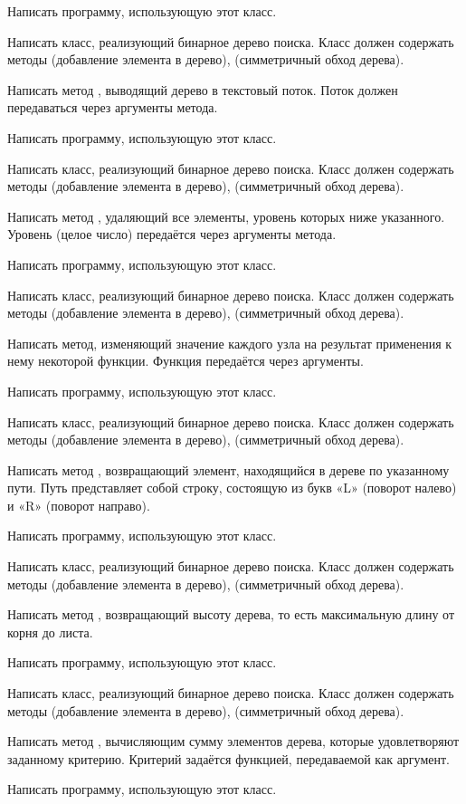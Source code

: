 Написать программу, использующую этот класс.

\task Написать класс, реализующий бинарное дерево поиска. Класс должен
содержать методы  (добавление элемента в дерево),
 (симметричный обход дерева).

Написать метод , выводящий дерево в текстовый поток. Поток
должен передаваться через аргументы метода.

Написать программу, использующую этот класс.

\task Написать класс, реализующий бинарное дерево поиска. Класс должен
содержать методы  (добавление элемента в дерево),
 (симметричный обход дерева).

Написать метод , удаляющий все элементы, уровень которых
ниже указанного. Уровень (целое число) передаётся через аргументы
метода.

Написать программу, использующую этот класс.

\task Написать класс, реализующий бинарное дерево поиска. Класс должен
содержать методы  (добавление элемента в дерево),
 (симметричный обход дерева).

Написать метод, изменяющий значение каждого узла на результат
применения к нему некоторой функции. Функция передаётся через
аргументы.

Написать программу, использующую этот класс.

\task Написать класс, реализующий бинарное дерево поиска. Класс должен
содержать методы  (добавление элемента в дерево),
 (симметричный обход дерева).

Написать метод , возвращающий элемент, находящийся в
дереве по указанному пути. Путь представляет собой
строку, состоящую из букв «L» (поворот налево) и «R» (поворот
направо).

Написать программу, использующую этот класс.

\task Написать класс, реализующий бинарное дерево поиска. Класс должен
содержать методы  (добавление элемента в дерево),
 (симметричный обход дерева).

Написать метод , возвращающий высоту дерева, то есть
максимальную длину от корня до листа.

Написать программу, использующую этот класс.

\task Написать класс, реализующий бинарное дерево поиска. Класс должен
содержать методы  (добавление элемента в дерево),
 (симметричный обход дерева).

Написать метод , вычисляющим сумму элементов дерева, которые
удовлетворяют заданному критерию. Критерий задаётся функцией,
передаваемой как аргумент.

Написать программу, использующую этот класс.